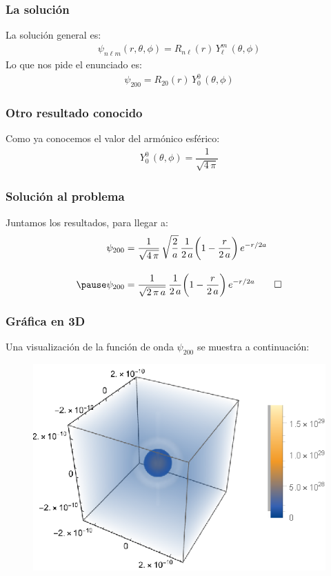 \documentclass[12pt]{beamer}
\begin{document}
\begin{frame}
\frametitle{La solución}
La solución general es:
\pause
\begin{align*}
\psi_{n \ell m} (r, \theta, \phi) = R_{n \ell} (r) \, Y_{\ell}^{m} \, (\theta, \phi)
\end{align*}
\pause
Lo que nos pide el enunciado es:
\pause
\begin{align*}
\psi_{200} = R_{2 0} (r) \, Y_{0}^{0} \, (\theta, \phi)
\end{align*}
\end{frame}
\begin{frame}
\frametitle{Otro resultado conocido}
Como ya conocemos el valor del armónico esférico:
\pause
\begin{align*}
Y_{0}^{0} \, (\theta, \phi) = \dfrac{1}{\sqrt{4 \, \pi}}
\end{align*}
\end{frame}
\begin{frame}
\frametitle{Solución al problema}
Juntamos los resultados, para llegar a:
\pause
\begin{eqnarray*}
\begin{aligned}
\psi_{200} &= \dfrac{1}{\sqrt{4 \, \pi}} \, \sqrt{\dfrac{2}{a}} \, \dfrac{1}{2 \, a} \bigg( 1 - \dfrac{r}{2 \, a} \bigg) \, e^{-r/2a} \\[1em] \pause
\psi_{200} &= \dfrac{1}{\sqrt{2 \, \pi \, a}} \, \dfrac{1}{2 \, a} \bigg( 1 - \dfrac{r}{2 \, a} \bigg) \, e^{-r/2a} \qed
\end{aligned}
\end{eqnarray*}
\end{frame}
\begin{frame}
\frametitle{Gráfica en 3D}
Una visualización de la función de onda $\psi_{200}$ se muestra a continuación:
\end{frame}
\begin{frame}[plain]
\begin{figure}
    \centering
    \includegraphics[scale=1]{Imagenes/Plot_Funcion_Onda_200.eps}
\end{figure}
\end{frame}
\end{document}
